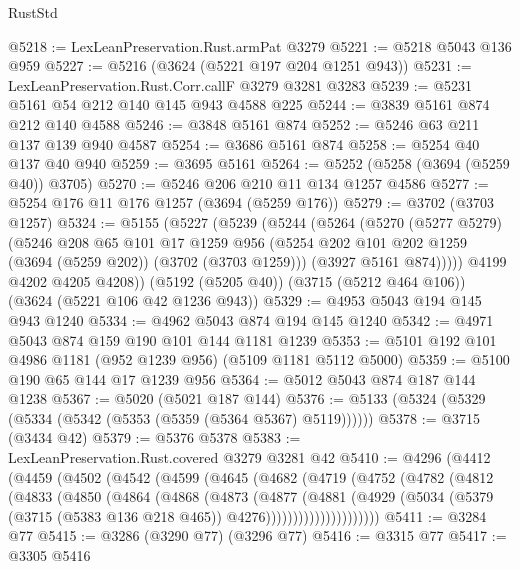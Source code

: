 \begin{lexlean}{RustStd}
\begin{coremodule}
@5218 := LexLeanPreservation.Rust.armPat @3279
@5221 := @5218 @5043 @136 @959
@5227 := @5216 (@3624 (@5221 @197 @204 @1251 @943))
@5231 := LexLeanPreservation.Rust.Corr.callF @3279 @3281 @3283
@5239 := @5231 @5161 @54 @212 @140 @145 @943 @4588 @225
@5244 := @3839 @5161 @874 @212 @140 @4588
@5246 := @3848 @5161 @874
@5252 := @5246 @63 @211 @137 @139 @940 @4587
@5254 := @3686 @5161 @874
@5258 := @5254 @40 @137 @40 @940
@5259 := @3695 @5161
@5264 := @5252 (@5258 (@3694 (@5259 @40)) @3705)
@5270 := @5246 @206 @210 @11 @134 @1257 @4586
@5277 := @5254 @176 @11 @176 @1257 (@3694 (@5259 @176))
@5279 := @3702 (@3703 @1257)
@5324 := @5155
    (@5227
      (@5239
        (@5244
          (@5264
            (@5270
              (@5277 @5279)
              (@5246
                @208
                @65
                @101
                @17
                @1259
                @956
                (@5254 @202 @101 @202 @1259 (@3694 (@5259 @202)) (@3702 (@3703 @1259)))
                (@3927 @5161 @874)))))
        @4199
        @4202
        @4205
        @4208))
    (@5192 (@5205 @40))
    (@3715 (@5212 @464 @106))
    (@3624 (@5221 @106 @42 @1236 @943))
@5329 := @4953 @5043 @194 @145 @943 @1240
@5334 := @4962 @5043 @874 @194 @145 @1240
@5342 := @4971 @5043 @874 @159 @190 @101 @144 @1181 @1239
@5353 := @5101 @192 @101 @4986 @1181 (@952 @1239 @956) (@5109 @1181 @5112 @5000)
@5359 := @5100 @190 @65 @144 @17 @1239 @956
@5364 := @5012 @5043 @874 @187 @144 @1238
@5367 := @5020 (@5021 @187 @144)
@5376 := @5133 (@5324 (@5329 (@5334 (@5342 (@5353 (@5359 (@5364 @5367) @5119))))))
@5378 := @3715 (@3434 @42)
@5379 := @5376 @5378
@5383 := LexLeanPreservation.Rust.covered @3279 @3281 @42
@5410 := @4296
    (@4412
      (@4459
        (@4502
          (@4542
            (@4599
              (@4645
                (@4682
                  (@4719
                    (@4752
                      (@4782
                        (@4812
                          (@4833
                            (@4850
                              (@4864
                                (@4868
                                  (@4873
                                    (@4877
                                      (@4881
                                        (@4929
                                          (@5034
                                            (@5379
                                              (@3715 (@5383 @136 @218 @465))
                                              @4276)))))))))))))))))))))
@5411 := @3284 @77
@5415 := @3286 (@3290 @77) (@3296 @77)
@5416 := @3315 @77
@5417 := @3305 @5416

\end{coremodule}
\end{lexlean}
